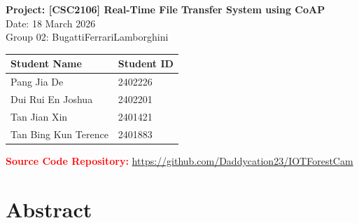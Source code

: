 \documentclass[12pt,a4paper]{article}
\DeclareRobustCommand{\changed}[1]{\textcolor{red}{#1}}
\begin{document}

\begin{center}
    \vspace*{1cm}
    {\Large \textbf{Project: [CSC2106] Real-Time File Transfer System using CoAP}} \\[0.5cm]
    {\large Date: 18 March 2026} \\[0.3cm]
    {\large Group 02: BugattiFerrariLamborghini} \\[1cm]

    \begin{tabular}{|p{7cm}|p{4cm}|}
        \hline
        \textbf{Student Name} & \textbf{Student ID} \\
        \hline
        Pang Jia De & 2402226 \\
        \hline
        Dui Rui En Joshua & 2402201 \\
        \hline
        Tan Jian Xin & 2401421 \\
        \hline
        Tan Bing Kun Terence & 2401883 \\
        \hline
    \end{tabular}

    \vspace{0.8cm}
    \changed{\textbf{Source Code Repository:} \url{https://github.com/Daddycation23/IOTForestCam}}
\end{center}

\vspace{1.5cm}


\section*{Abstract}
\end{document}
